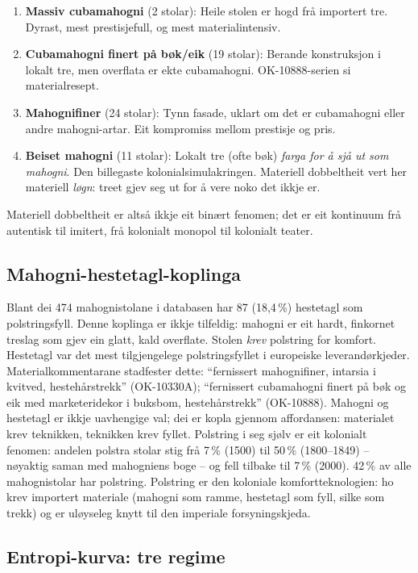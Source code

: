 \documentclass[10pt, a4paper, twocolumn]{article}
\begin{document}
\begin{enumerate}
  \item \textbf{Massiv cubamahogni} (2 stolar): Heile stolen er hogd frå importert tre. Dyrast, mest prestisjefull, og mest materialintensiv.
  \item \textbf{Cubamahogni finert på bøk/eik} (19 stolar): Berande konstruksjon i lokalt tre, men overflata er ekte cubamahogni. OK-10888-serien si materialresept.
  \item \textbf{Mahognifiner} (24 stolar): Tynn fasade, uklart om det er cubamahogni eller andre mahogni-artar. Eit kompromiss mellom prestisje og pris.
  \item \textbf{Beiset mahogni} (11 stolar): Lokalt tre (ofte bøk) \emph{farga for å sjå ut som mahogni}. Den billegaste kolonialsimulakringen. Materiell dobbeltheit vert her materiell \emph{løgn}: treet gjev seg ut for å vere noko det ikkje er.
\end{enumerate}

Materiell dobbeltheit er altså ikkje eit binært fenomen; det er eit kontinuum frå autentisk til imitert, frå kolonialt monopol til kolonialt teater.

\subsection{Mahogni-hestetagl-koplinga}

Blant dei 474 mahognistolane i databasen har 87 (18,4\,\%) hestetagl som polstringsfyll. Denne koplinga er ikkje tilfeldig: mahogni er eit hardt, finkornet treslag som gjev ein glatt, kald overflate. Stolen \emph{krev} polstring for komfort. Hestetagl var det mest tilgjengelege polstringsfyllet i europeiske leverandørkjeder. Materialkommentarane stadfester dette: ``fernissert mahognifiner, intarsia i kvitved, hestehårstrekk'' (OK-10330A); ``fernissert cubamahogni finert på bøk og eik med marketeridekor i buksbom, hestehårstrekk'' (OK-10888). Mahogni og hestetagl er ikkje uavhengige val; dei er kopla gjennom affordansen: materialet krev teknikken, teknikken krev fyllet. Polstring i seg sjølv er eit kolonialt fenomen: andelen polstra stolar stig frå 7\,\% (1500) til 50\,\% (1800--1849) -- nøyaktig saman med mahogniens boge -- og fell tilbake til 7\,\% (2000). 42\,\% av alle mahognistolar har polstring. Polstring er den koloniale komfortteknologien: ho krev importert materiale (mahogni som ramme, hestetagl som fyll, silke som trekk) og er uløyseleg knytt til den imperiale forsyningskjeda.

\subsection{Entropi-kurva: tre regime}
\end{document}
